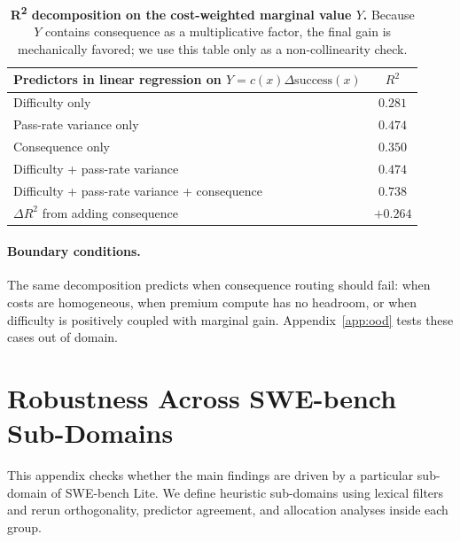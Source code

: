 \documentclass{article}
\begin{document}
\begin{table}[h]
\centering
\caption{\textbf{R\textsuperscript{2} decomposition on the
cost-weighted marginal value $Y$.} Because $Y$ contains consequence as
a multiplicative factor, the final gain is mechanically favored; we
use this table only as a non-collinearity check.}
\label{tab:r2decomp}
\small
\begin{tabular}{lc}
\toprule
Predictors in linear regression on $Y=c(x)\Delta\mathrm{success}(x)$ & $R^{2}$ \\
\midrule
Difficulty only                                   & $0.281$ \\
Pass-rate variance only                           & $0.474$ \\
Consequence only                                  & $0.350$ \\
Difficulty + pass-rate variance                   & $0.474$ \\
Difficulty + pass-rate variance + consequence     & $\mathbf{0.738}$ \\
\midrule
$\Delta R^{2}$ from adding consequence            & $+0.264$ \\
\bottomrule
\end{tabular}
\end{table}

\paragraph{Boundary conditions.}
The same decomposition predicts when consequence routing should fail:
when costs are homogeneous, when premium compute has no headroom, or
when difficulty is positively coupled with marginal gain.
Appendix~\ref{app:ood} tests these cases out of domain.

\section{Robustness Across SWE-bench Sub-Domains}
\label{app:subdomain}

This appendix checks whether the main findings are driven by a
particular sub-domain of SWE-bench Lite. We define heuristic
sub-domains using lexical filters and rerun orthogonality, predictor
agreement, and allocation analyses inside each group.
\end{document}

